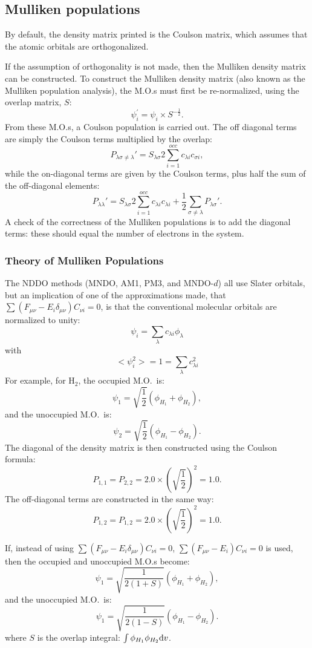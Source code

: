 \subsection{Mulliken populations}
By default, the density matrix printed is the Coulson matrix, which
assumes that the atomic orbitals are orthogonalized.

If the assumption of orthogonality is not made, then the Mulliken density
matrix can be constructed. To construct the Mulliken density matrix (also known
as the Mulliken population analysis), the M.O.s must first be re-normalized,
using the overlap matrix, $S$:
$$
\psi_i^{'} = \psi_i\times S^{-\frac{1}{2}}. 
$$
From these M.O.s, a Coulson population is carried out. The off diagonal terms
are simply the Coulson terms multiplied by the overlap:
$$
P_{\lambda\sigma\neq\lambda}'=S_{\lambda\sigma}2\sum_{i=1}^{occ}c_{\lambda i}
c_{\sigma i},
$$
while the on-diagonal terms are given by the Coulson terms, plus half the sum
of the off-diagonal elements:
$$
P_{\lambda \lambda}' =S_{\lambda\sigma}2\sum_{i=1}^{occ}c_{\lambda i}c_{\lambda i}
 + \frac{1}{2}\sum_{\sigma\neq\lambda}P_{\lambda \sigma}'.
$$
A check of the correctness of the Mulliken populations is to add the diagonal
terms: these should equal the number of electrons in the system.

\subsubsection*{Theory of Mulliken Populations}
The NDDO methods (MNDO, AM1, PM3, and MNDO-$d$) all use Slater orbitals,
but an implication of one of the approximations made, that $\sum(F_{\mu \nu}-E_i\delta_{\mu\nu})
C_{\nu i} =0$, is that the conventional molecular orbitals are normalized
to unity:
$$
\psi_i=\sum_{\lambda}c_{\lambda i}\phi_{\lambda}
$$
with
$$
<\psi_i^2> = 1 = \sum_{\lambda}c_{\lambda i}^2
$$
For example, for H$_2$, the occupied M.O.\ is:
$$
\psi_1 = \sqrt{\frac{1}{2}}(\phi_{H_1}+\phi_{H_2}),
$$
and the unoccupied M.O.\ is:
$$ 
\psi_2 = \sqrt{\frac{1}{2}}(\phi_{H_1}-\phi_{H_2}). 
$$ 
The diagonal of the density matrix is then constructed using the Coulson
formula:
$$
P_{1,1}=P_{2,2}=2.0\times\left(\sqrt{\frac{1}{2}}\right)^2 =1.0.
$$
The off-diagonal terms are constructed in the same way:
$$
P_{1,2}=P_{1,2}=2.0\times\left(\sqrt{\frac{1}{2}}\right)^2 =1.0.
$$

If, instead of using $\sum(F_{\mu \nu}-E_i\delta_{\mu\nu}) C_{\nu i} =0$,
$\sum(F_{\mu \nu}-E_i) C_{\nu i} =0$ is used, then the occupied and unoccupied
M.O.s become:
$$ 
\psi_1 = \sqrt{\frac{1}{2(1+S)}}(\phi_{H_1}+\phi_{H_2}),
$$
and the unoccupied M.O.\ is:
$$
\psi_1 = \sqrt{\frac{1}{2(1-S)}}(\phi_{H_1}-\phi_{H_2}).
$$       
where $S$ is the overlap integral: $\int\phi_{H_1}\phi_{H_2}{\rm d}v$.

